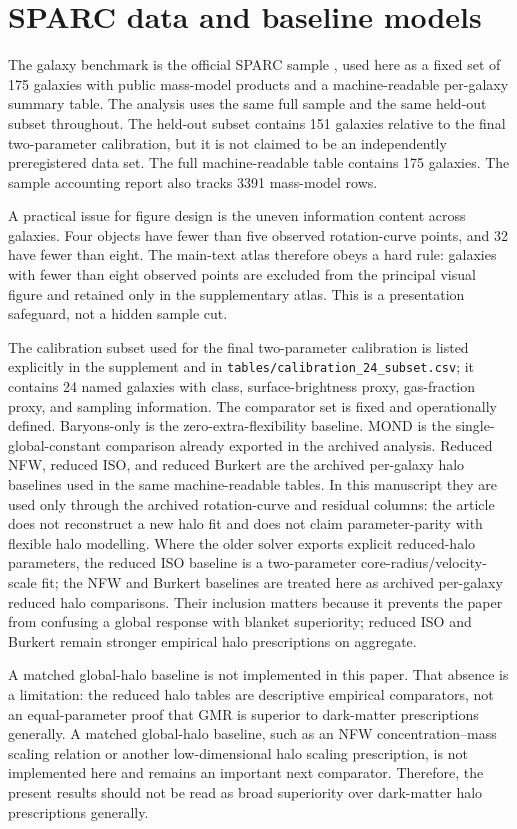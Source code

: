 ﻿\documentclass[twocolumn,linenumbers]{aastex701}
\begin{document}
\section{SPARC data and baseline models}

The galaxy benchmark is the official SPARC sample \citep{lelli2016}, used here as a fixed set of 175 galaxies with public mass-model products and a machine-readable per-galaxy summary table. The analysis uses the same full sample and the same held-out subset throughout. The held-out subset contains 151 galaxies relative to the final two-parameter calibration, but it is not claimed to be an independently preregistered data set. The full machine-readable table contains 175 galaxies. The sample accounting report also tracks 3391 mass-model rows.

A practical issue for figure design is the uneven information content across galaxies. Four objects have fewer than five observed rotation-curve points, and 32 have fewer than eight. The main-text atlas therefore obeys a hard rule: galaxies with fewer than eight observed points are excluded from the principal visual figure and retained only in the supplementary atlas. This is a presentation safeguard, not a hidden sample cut.

The calibration subset used for the final two-parameter calibration is listed explicitly in the supplement and in \texttt{tables/calibration\_24\_subset.csv}; it contains 24 named galaxies with class, surface-brightness proxy, gas-fraction proxy, and sampling information. The comparator set is fixed and operationally defined. Baryons-only is the zero-extra-flexibility baseline. MOND is the single-global-constant comparison already exported in the archived analysis. Reduced NFW, reduced ISO, and reduced Burkert are the archived per-galaxy halo baselines used in the same machine-readable tables. In this manuscript they are used only through the archived rotation-curve and residual columns: the article does not reconstruct a new halo fit and does not claim parameter-parity with flexible halo modelling. Where the older solver exports explicit reduced-halo parameters, the reduced ISO baseline is a two-parameter core-radius/velocity-scale fit; the NFW and Burkert baselines are treated here as archived per-galaxy reduced halo comparisons. Their inclusion matters because it prevents the paper from confusing a global response with blanket superiority; reduced ISO and Burkert remain stronger empirical halo prescriptions on aggregate.

A matched global-halo baseline is not implemented in this paper. That absence is a limitation: the reduced halo tables are descriptive empirical comparators, not an equal-parameter proof that GMR is superior to dark-matter prescriptions generally. A matched global-halo baseline, such as an NFW concentration--mass scaling relation or another low-dimensional halo scaling prescription, is not implemented here and remains an important next comparator. Therefore, the present results should not be read as broad superiority over dark-matter halo prescriptions generally.
\end{document}
